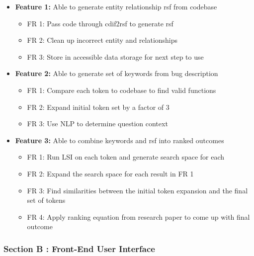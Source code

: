 \documentclass[11pt,]{article}
\providecommand{\tightlist}{%
  \setlength{\itemsep}{0pt}\setlength{\parskip}{0pt}}
\begin{document}
\begin{itemize}
\tightlist
\item
  \textbf{Feature 1:} Able to generate entity relationship rsf from
  codebase

  \begin{itemize}
  \tightlist
  \item
    FR 1: Pass code through cdif2rsf to generate rsf
  \item
    FR 2: Clean up incorrect entity and relationships
  \item
    FR 3: Store in accessible data storage for next step to use
  \end{itemize}
\item
  \textbf{Feature 2:} Able to generate set of keywords from bug
  description

  \begin{itemize}
  \tightlist
  \item
    FR 1: Compare each token to codebase to find valid functions
  \item
    FR 2: Expand initial token set by a factor of 3
  \item
    FR 3: Use NLP to determine question context
  \end{itemize}
\item
  \textbf{Feature 3:} Able to combine keywords and rsf into ranked
  outcomes

  \begin{itemize}
  \tightlist
  \item
    FR 1: Run LSI on each token and generate search space for each
  \item
    FR 2: Expand the search space for each result in FR 1
  \item
    FR 3: Find similarities between the initial token expansion and the
    final set of tokens
  \item
    FR 4: Apply ranking equation from research paper to come up with
    final outcome
  \end{itemize}
\end{itemize}

\hypertarget{section-b-front-end-user-interface}{%
\subsubsection{Section B : Front-End User
Interface}\label{section-b-front-end-user-interface}}
\end{document}
